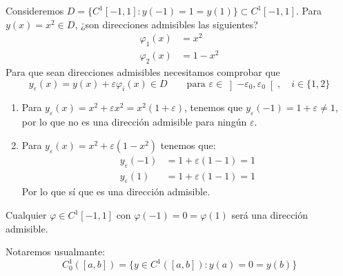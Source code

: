 \begin{ejemplo}
    Consideremos $D = \{C^1[-1,1] : y(-1) = 1 = y(1)\}\subset C^1[-1,1]$. Para $y(x) = x^2 \in D$, ¿son direcciones admisibles las siguientes?
    \begin{align*}
        \varphi_1(x) &= x^2 \\
        \varphi_2(x) &= 1-x^2
    \end{align*}
    Para que sean direcciones admisibles necesitamos comprobar que
    \begin{equation*}
        y_{\varepsilon}(x) = y(x) + \varepsilon\varphi_i(x)\in D \qquad \text{para $\varepsilon \in \left]-\varepsilon_0,\varepsilon_0\right[$}, \quad i \in \{1,2\}
    \end{equation*}
    \begin{enumerate}
        \item Para $y_\varepsilon(x) = x^2+\varepsilon x^2 = x^2(1+\varepsilon)$, tenemos que $y_{\varepsilon}(-1) = 1+\varepsilon\neq 1$, por lo que no es una dirección admisible para ningún $\varepsilon$.
        \item Para $y_{\varepsilon}(x) = x^2+\varepsilon (1-x^2)$ tenemos que:
            \begin{align*}
                y_{\varepsilon}(-1) &= 1 + \varepsilon(1-1) = 1 \\
                y_\varepsilon(1) &= 1 + \varepsilon(1-1) = 1
            \end{align*}
            Por lo que sí que es una dirección admisible.
    \end{enumerate}
    Cualquier $\varphi \in C^1[-1,1]$ con $\varphi(-1) = 0 = \varphi(1)$ será una dirección admisible.
\end{ejemplo}

\begin{notacion}
    Notaremos usualmante:
    \begin{equation*}
        C^1_0([a,b]) = \{y\in C^1([a,b]) : y(a) = 0 = y(b)\}
    \end{equation*}
\end{notacion}

